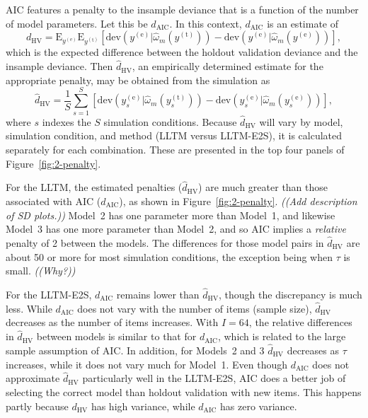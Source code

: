 AIC features a penalty to the insample deviance that is a function of the number of model parameters. Let this be $d_\mathrm{AIC}$. In this context, $d_\mathrm{AIC}$ is an estimate of
\begin{equation}
	d_{\mathrm{HV}} = \mathrm{E}_{y^{(\mathrm{e})}} \mathrm{E}_{y^{(\mathrm{t})}} 
	[
		\mathrm{dev}(y^{(\mathrm{e})} | \hat \omega_m(y^{(\mathrm{t})})) -
		\mathrm{dev}(y^{(\mathrm{e})} | \hat \omega_m(y^{(\mathrm{e})}))
	]
,\end{equation}
which is the expected difference between the holdout validation deviance and the insample deviance. Then $\hat d_{\mathrm{HV}}$, an empirically determined estimate for the appropriate penalty, may be obtained from the simulation as
\begin{equation}
	\hat d_{\mathrm{HV}} = \frac{1}{S} \sum_{s=1}^{S} 
	\left [
		\mathrm{dev}(y^{(\mathrm{e})}_s | \hat \omega_m(y^{(\mathrm{t})}_s)) -
		\mathrm{dev}(y^{(\mathrm{e})}_s | \hat \omega_m(y^{(\mathrm{e})}_s))
	\right ]
,\end{equation}
where $s$ indexes the $S$ simulation conditions.
Because $\hat d_{\mathrm{HV}}$ will vary by model, simulation condition, and method (LLTM versus LLTM-E2S), it is calculated separately for each combination. These are presented in the top four panels of Figure~\ref{fig:2-penalty}. 

For the LLTM, the estimated penalties ($\hat d_{\mathrm{HV}}$) are much greater than those associated with AIC ($d_\mathrm{AIC}$), as shown in Figure~\ref{fig:2-penalty}. \emph{((Add description of SD plots.))} Model~2 has one parameter more than Model~1, and likewise Model~3 has one more parameter than Model~2, and so AIC implies a \emph{relative} penalty of 2 between the models. The differences for those model pairs in $\hat d_{\mathrm{HV}}$ are about 50 or more for most simulation conditions, the exception being when $\tau$ is small. \emph{((Why?))}

For the LLTM-E2S, $d_\mathrm{AIC}$ remains lower than $\hat d_{\mathrm{HV}}$, though the discrepancy is much less. While $d_\mathrm{AIC}$ does not vary with the number of items (sample size), $\hat d_{\mathrm{HV}}$ decreases as the number of items increases. With $I=64$, the relative differences in $\hat d_{\mathrm{HV}}$ between models is similar to that for $d_\mathrm{AIC}$, which is related to the large sample assumption of AIC. In addition, for Models~2 and 3 $\hat d_{\mathrm{HV}}$ decreases as $\tau$ increases, while it does not vary much for Model~1. Even though $d_\mathrm{AIC}$ does not approximate $\hat d_{\mathrm{HV}}$ particularly well in the LLTM-E2S, AIC does a better job of selecting the correct model than holdout validation with new items. This happens partly because $d_{\mathrm{HV}}$ has high variance, while $d_\mathrm{AIC}$ has zero variance.

